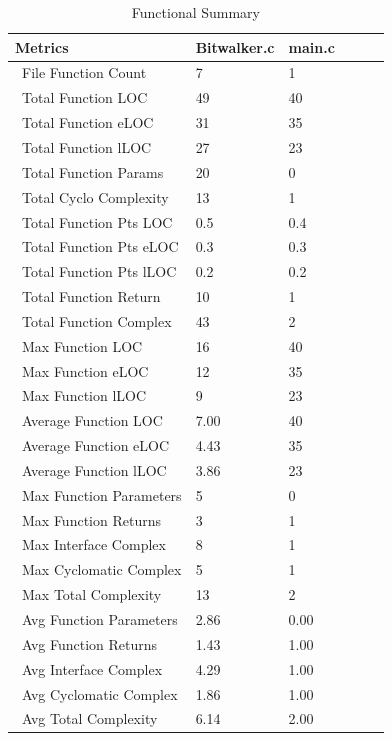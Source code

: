 \begin{longtable}{||p{}|p{}|p{}|p{}|p{}|p{}||}
  \caption{Functional Summary}\\
    \hline\hline
    \textbf{Metrics} & \textbf{Bitwalker.c} & \textbf{main.c}\\
    \hline\hline
    \endhead
    \hline\hline
    \endfoot
    \ File Function Count
& 7
& 1
    \\
    \hline
    \ Total Function LOC
& 49
& 40
    \\
    \hline
    \ Total Function eLOC
& 31
& 35
    \\
    \hline
    \ Total Function lLOC
& 27
& 23
    \\
    \hline
    \ Total Function Params
& 20
& 0
    \\
    \hline
    \ Total Cyclo Complexity
& 13
& 1
    \\
    \hline
    \ Total Function Pts LOC
& 0.5
& 0.4
    \\
    \hline
    \ Total Function Pts eLOC
& 0.3
& 0.3
    \\
    \hline
    \ Total Function Pts lLOC
& 0.2
& 0.2
    \\
    \hline
    \ Total Function Return
& 10
& 1
    \\
    \hline
    \ Total Function Complex
& 43
& 2
    \\
    \hline
    \ Max Function LOC
& 16
& 40
    \\
    \hline
    \ Max Function eLOC
& 12
& 35
    \\
    \hline
    \ Max Function lLOC
& 9
& 23
    \\
    \hline
    \ Average Function LOC
& 7.00
& 40
    \\
    \hline
    \ Average Function eLOC
& 4.43
& 35
    \\
    \hline
    \ Average Function lLOC
& 3.86
& 23
    \\
    \hline
    \ Max Function Parameters
& 5
& 0
    \\
    \hline
    \ Max Function Returns
& 3
& 1
    \\
    \hline
    \ Max Interface Complex
& 8
& 1
    \\
    \hline
    \ Max Cyclomatic Complex
& 5
& 1
    \\
    \hline
    \ Max Total Complexity
& 13
& 2
    \\
    \hline
    \ Avg Function Parameters
& 2.86
& 0.00
    \\
    \hline
    \ Avg Function Returns
& 1.43
& 1.00
    \\
    \hline
    \ Avg Interface Complex
& 4.29
& 1.00
    \\
    \hline
    \ Avg Cyclomatic Complex
& 1.86
& 1.00
    \\
    \hline
    \ Avg Total Complexity
& 6.14
& 2.00
    \\
    \hline
\end{longtable}

